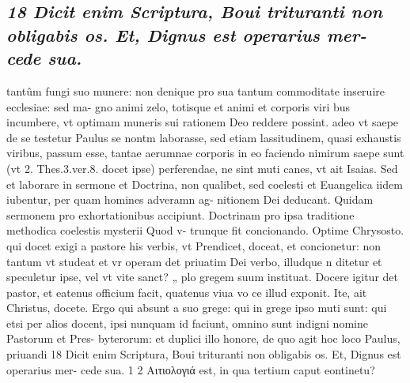 \documentclass{article}
\begin{document}
\begin{pages}
\subsection*{\textit{18 Dicit enim Scriptura, Boui trituranti non obligabis os. Et, Dignus est operarius mer- cede sua.}}tantûm fungi suo munere: non denique pro sua tantum commoditate inseruire ecclesiae: sed ma- gno animi zelo, totisque et animi et corporis viri bus incumbere, vt optimam muneris sui rationem Deo reddere possint. adeo vt saepe de se testetur Paulus se nontm laborasse, sed etiam lassitudinem, quasi exhaustis viribus, passum esse, tantae aerumnae corporis in eo faciendo nimirum saepe sunt (vt 2. Thes.3.ver.8. docet ipse) perferendae, ne sint muti canes, vt ait Isaias. Sed et laborare in sermone et Doctrina, non qualibet, sed coelesti et Euangelica iidem iubentur, per quam homines adveramn ag- nitionem Dei deducant. Quidam sermonem pro exhortationibus accipiunt. Doctrinam pro ipsa traditione methodica coelestis mysterii Quod v- trunque fit concionando. Optime Chrysosto. qui docet exigi a pastore his verbis, vt Prendicet, doceat, et concionetur: non tantum vt studeat et vr operam det priuatim Dei verbo, illudque n ditetur et speculetur ipse, vel vt vite sanct? „ plo gregem suum instituat. Docere igitur det pastor, et eatenus officium facit, quatenus viua vo ce illud exponit. Ite, ait Christus, docete. Ergo qui absunt a suo grege: qui in grege ipso muti sunt: qui etsi per alios docent, ipsi nunquam id faciunt, omnino sunt indigni nomine Pastorum et Pres- byterorum: et duplici illo honore, de quo agit hoc loco Paulus, priuandi 18 Dicit enim Scriptura, Boui trituranti non obligabis os. Et, Dignus est operarius mer- cede sua. 1 2 Αιτιολογιά est, in qua tertium caput eontinetu?  \pend

\end{pages}
\end{document}
